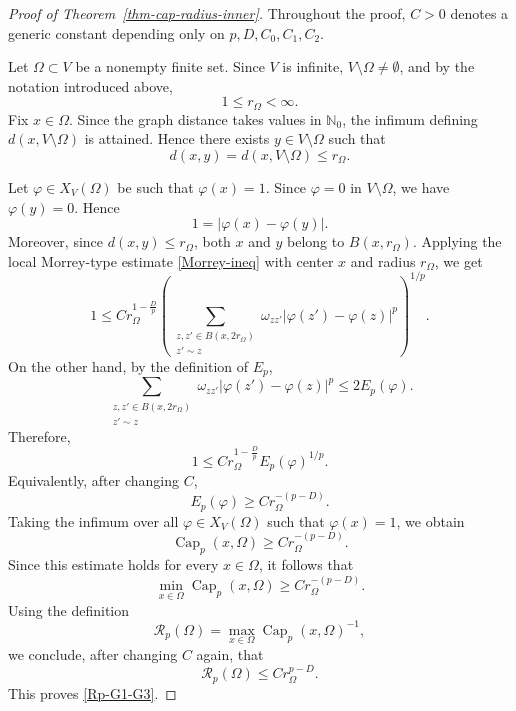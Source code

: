 \documentclass[twoside,12pt,letter]{article}
\theoremstyle{plain}
\theoremstyle{definition}
\theoremstyle{remark}
\numberwithin{equation}{section}
\begin{document}
\begin{proof}[Proof of Theorem~\ref{thm-cap-radius-inner}]
Throughout the proof, \(C>0\) denotes a generic constant depending only on
\(p,D,C_0,C_1,C_2\).

Let \(\Omega\subset V\) be a nonempty finite set. Since \(V\) is infinite,
\(V\setminus\Omega\neq\emptyset\), and by the notation introduced above,
\[
1\le r_\Omega<\infty.
\]
Fix \(x\in\Omega\). Since the graph distance takes values in
\(\mathbb N_0\), the infimum defining \(d(x,V\setminus\Omega)\) is attained.
Hence there exists \(y\in V\setminus\Omega\) such that
\[
d(x,y)=d(x,V\setminus\Omega)\le r_\Omega.
\]

Let \(\varphi\in X_V(\Omega)\) be such that \(\varphi(x)=1\). Since
\(\varphi=0\) in \(V\setminus\Omega\), we have \(\varphi(y)=0\). Hence
\[
1=|\varphi(x)-\varphi(y)|.
\]
Moreover, since \(d(x,y)\le r_\Omega\), both \(x\) and \(y\) belong to
\(B(x,r_\Omega)\). Applying the local Morrey-type estimate
\eqref{Morrey-ineq} with center \(x\) and radius \(r_\Omega\), we get
\[
1
\le
C r_\Omega^{1-\frac{D}{p}}
\left(
\sum_{\substack{z,z'\in B(x,2r_\Omega)\\ z'\sim z}}
\omega_{zz'}|\varphi(z')-\varphi(z)|^p
\right)^{1/p}.
\]
On the other hand, by the definition of \(E_p\),
\[
\sum_{\substack{z,z'\in B(x,2r_\Omega)\\ z'\sim z}}
\omega_{zz'}|\varphi(z')-\varphi(z)|^p
\le
2E_p(\varphi).
\]
Therefore,
\[
1
\le
C r_\Omega^{1-\frac{D}{p}} E_p(\varphi)^{1/p}.
\]
Equivalently, after changing \(C\),
\[
E_p(\varphi)
\ge
C r_\Omega^{-(p-D)}.
\]
Taking the infimum over all \(\varphi\in X_V(\Omega)\) such that
\(\varphi(x)=1\), we obtain
\[
\operatorname{Cap}_p(x,\Omega)
\ge
C r_\Omega^{-(p-D)}.
\]
Since this estimate holds for every \(x\in\Omega\), it follows that
\[
\min_{x\in\Omega}\operatorname{Cap}_p(x,\Omega)
\ge
C r_\Omega^{-(p-D)}.
\]
Using the definition
\[
\mathcal R_p(\Omega)
=
\max_{x\in\Omega}\operatorname{Cap}_p(x,\Omega)^{-1},
\]
we conclude, after changing \(C\) again, that
\[
\mathcal R_p(\Omega)
\le
Cr_\Omega^{p-D}.
\]
This proves \eqref{Rp-G1-G3}.
\end{proof}
\end{document}

